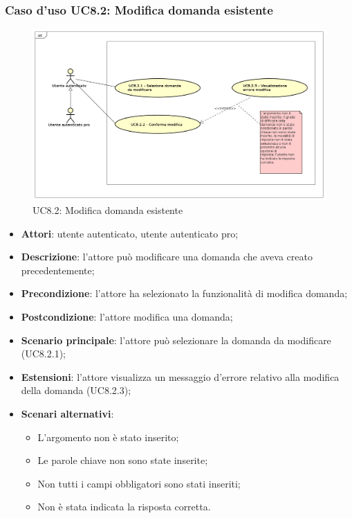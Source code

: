 	\subsubsection{Caso d'uso UC8.2: Modifica domanda esistente}
	\label{UC8.2}
	\begin{figure}[h]
		\centering
			\includegraphics[scale=0.41,keepaspectratio]{UML/UC8_2.png}
		\caption{UC8.2: Modifica domanda esistente}
	\end{figure}
	\FloatBarrier
	\begin{itemize}
		\item
			\textbf{Attori}: utente autenticato, utente autenticato pro;
		\item		
			\textbf{Descrizione}: l'attore può modificare una domanda che aveva creato precedentemente;
		\item
			\textbf{Precondizione}: l'attore ha selezionato la funzionalità di modifica domanda;
		\item
			\textbf{Postcondizione}: l'attore modifica una domanda;
		\item
			\textbf{Scenario principale}: l'attore può selezionare la domanda da modificare (UC8.2.1);
	       		
	 	\item
			\textbf{Estensioni}: l'attore visualizza un messaggio d'errore relativo alla modifica della domanda (UC8.2.3);
	 	\item
	 		\textbf{Scenari alternativi}:
				\begin{itemize}
					\item 	
						L'argomento non è stato inserito;
					\item
						Le parole chiave non sono state inserite;
					\item
						Non tutti i campi obbligatori sono stati inseriti; 
					\item
						Non è stata indicata la risposta corretta.	
				\end{itemize}
	\end{itemize}
	
